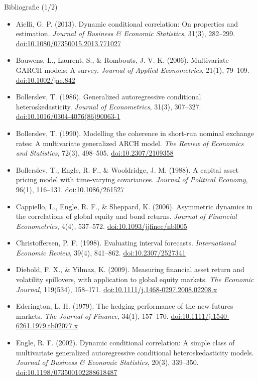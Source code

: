 \begin{frame}{Bibliografie (1/2)}
\itemsize{\scriptsize}
\begin{itemize}
    \item Aielli, G. P. (2013). Dynamic conditional correlation: On properties and estimation. \textit{Journal of Business \& Economic Statistics}, 31(3), 282--299. \href{https://doi.org/10.1080/07350015.2013.771027}{doi:10.1080/07350015.2013.771027}
    \item Bauwens, L., Laurent, S., \& Rombouts, J. V. K. (2006). Multivariate GARCH models: A survey. \textit{Journal of Applied Econometrics}, 21(1), 79--109. \href{https://doi.org/10.1002/jae.842}{doi:10.1002/jae.842}
    \item Bollerslev, T. (1986). Generalized autoregressive conditional heteroskedasticity. \textit{Journal of Econometrics}, 31(3), 307--327. \href{https://doi.org/10.1016/0304-4076(86)90063-1}{doi:10.1016/0304-4076(86)90063-1}
    \item Bollerslev, T. (1990). Modelling the coherence in short-run nominal exchange rates: A multivariate generalized ARCH model. \textit{The Review of Economics and Statistics}, 72(3), 498--505. \href{https://doi.org/10.2307/2109358}{doi:10.2307/2109358}
    \item Bollerslev, T., Engle, R. F., \& Wooldridge, J. M. (1988). A capital asset pricing model with time-varying covariances. \textit{Journal of Political Economy}, 96(1), 116--131. \href{https://doi.org/10.1086/261527}{doi:10.1086/261527}
    \item Cappiello, L., Engle, R. F., \& Sheppard, K. (2006). Asymmetric dynamics in the correlations of global equity and bond returns. \textit{Journal of Financial Econometrics}, 4(4), 537--572. \href{https://doi.org/10.1093/jjfinec/nbl005}{doi:10.1093/jjfinec/nbl005}
    \item Christoffersen, P. F. (1998). Evaluating interval forecasts. \textit{International Economic Review}, 39(4), 841--862. \href{https://doi.org/10.2307/2527341}{doi:10.2307/2527341}
    \item Diebold, F. X., \& Yilmaz, K. (2009). Measuring financial asset return and volatility spillovers, with application to global equity markets. \textit{The Economic Journal}, 119(534), 158--171. \href{https://doi.org/10.1111/j.1468-0297.2008.02208.x}{doi:10.1111/j.1468-0297.2008.02208.x}
    \item Ederington, L. H. (1979). The hedging performance of the new futures markets. \textit{The Journal of Finance}, 34(1), 157--170. \href{https://doi.org/10.1111/j.1540-6261.1979.tb02077.x}{doi:10.1111/j.1540-6261.1979.tb02077.x}
    \item Engle, R. F. (2002). Dynamic conditional correlation: A simple class of multivariate generalized autoregressive conditional heteroskedasticity models. \textit{Journal of Business \& Economic Statistics}, 20(3), 339--350. \href{https://doi.org/10.1198/073500102288618487}{doi:10.1198/073500102288618487}
\end{itemize}
\end{frame}

